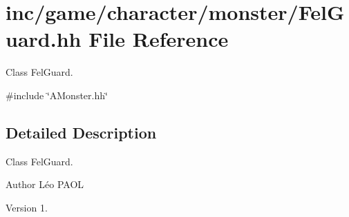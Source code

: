 \hypertarget{FelGuard_8hh}{}\section{inc/game/character/monster/\+Fel\+Guard.hh File Reference}
\label{FelGuard_8hh}


Class Fel\+Guard.  


{\ttfamily \#include \char`\"{}A\+Monster.\+hh\char`\"{}}\newline


\subsection{Detailed Description}
Class Fel\+Guard. 

\begin{DoxyAuthor}{Author}
Léo P\+A\+OL 
\end{DoxyAuthor}
\begin{DoxyVersion}{Version}
1. 
\end{DoxyVersion}
